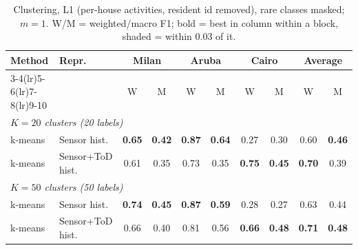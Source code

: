 \begin{table}[H]
\centering\small
\caption{Clustering, L1 (per-house activities, resident id removed), rare classes masked; $m=1$. W/M = weighted/macro F1; bold = best in column within a block, shaded = within 0.03 of it.}
\label{tab:clu_l1_masked_m1}
\setlength{\tabcolsep}{3.5pt}
\begin{tabular}{llcc|cc|cc|cc}
\toprule
Method & Repr. & \multicolumn{2}{c}{Milan} & \multicolumn{2}{c}{Aruba} & \multicolumn{2}{c}{Cairo} & \multicolumn{2}{c}{Average} \\
\cmidrule(lr){3-4}\cmidrule(lr){5-6}\cmidrule(lr){7-8}\cmidrule(lr){9-10}
 & & W & M & W & M & W & M & W & M \\
\midrule
\multicolumn{10}{l}{\textit{$K = 20$ clusters (20 labels)}} \\
\midrule
k-means & Sensor hist. & \cellcolor{blue!12}\textbf{0.65} & \cellcolor{blue!12}\textbf{0.42} & \cellcolor{blue!12}\textbf{0.87} & \cellcolor{blue!12}\textbf{0.64} & 0.27 & 0.30 & 0.60 & \cellcolor{blue!12}\textbf{0.46} \\
k-means & Sensor+ToD hist. & 0.61 & 0.35 & 0.73 & 0.35 & \cellcolor{blue!12}\textbf{0.75} & \cellcolor{blue!12}\textbf{0.45} & \cellcolor{blue!12}\textbf{0.70} & 0.39 \\
\midrule
\multicolumn{10}{l}{\textit{$K = 50$ clusters (50 labels)}} \\
\midrule
k-means & Sensor hist. & \cellcolor{blue!12}\textbf{0.74} & \cellcolor{blue!12}\textbf{0.45} & \cellcolor{blue!12}\textbf{0.87} & \cellcolor{blue!12}\textbf{0.59} & 0.28 & 0.27 & 0.63 & 0.44 \\
k-means & Sensor+ToD hist. & 0.66 & 0.40 & 0.81 & 0.56 & \cellcolor{blue!12}\textbf{0.66} & \cellcolor{blue!12}\textbf{0.48} & \cellcolor{blue!12}\textbf{0.71} & \cellcolor{blue!12}\textbf{0.48} \\
\bottomrule
\end{tabular}
\end{table}

